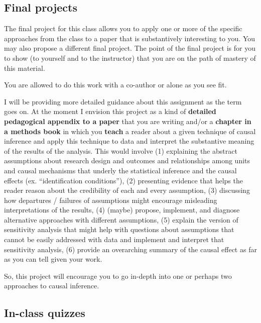 \documentclass[11pt,letterpaper]{article}
\begin{document}
    \subsection*{Final projects}

    The final project for this class allows you to apply one or more of the
    specific approaches from the class to a paper that is substantively
    interesting to you. You may also propose a different final project. The
    point of the final project is for you to show (to yourself and to the
    instructor) that you are on the path of mastery of this material.

    You are allowed to do this work with a co-author or alone as you see fit.

    I will be providing more detailed guidance about this assignment as the
    term goes on. At the moment I envision this project as a kind of
    \textbf{detailed pedagogical appendix to a paper} that you are writing
    and/or a \textbf{chapter in a methods book} in which you \textbf{teach} a
    reader about a given technique of causal inference and apply this technique
    to data and interpret the substantive meaning of the results of the
    analysis. This would involve (1) explaining the abstract assumptions about
    research design and outcomes and relationships among units and causal
    mechanisms that underly the statistical inference and the causal effects
    (ex. ``identification conditions''), (2) presenting evidence that helps the
    reader reason about the credibility of each and every assumption, (3)
    discussing how departures / failures of assumptions might encourage
    misleading interpretations of the results, (4) (maybe) propose, implement,
    and diagnose alternative approaches with different assumptions, (5) explain
    the version of sensitivity analysis that might help with questions about
    assumptions that cannot be easily addressed with data and implement and
    interpret that sensitivity analysis, (6) provide an overarching summary of
    the causal effect as far as you can tell given your work.

    So, this project will encourage you to go in-depth into one or perhaps two
    approaches to causal inference.

    \subsection*{In-class quizzes}
\end{document}
